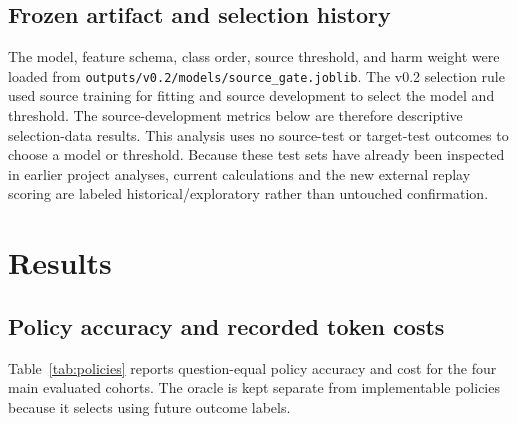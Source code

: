 \documentclass[conference]{IEEEtran}
\begin{document}
\subsection{Frozen artifact and selection history}
The model, feature schema, class order, source threshold, and harm weight were loaded from \texttt{outputs/v0.2/models/source\_gate.joblib}. The v0.2 selection rule used source training for fitting and source development to select the model and threshold. The source-development metrics below are therefore descriptive selection-data results. This analysis uses no source-test or target-test outcomes to choose a model or threshold. Because these test sets have already been inspected in earlier project analyses, current calculations and the new external replay scoring are labeled historical/exploratory rather than untouched confirmation.

\section{Results}
\subsection{Policy accuracy and recorded token costs}
Table~\ref{tab:policies} reports question-equal policy accuracy and cost for the four main evaluated cohorts. The oracle is kept separate from implementable policies because it selects using future outcome labels.
\end{document}
